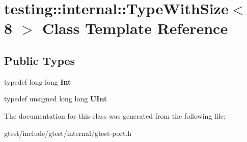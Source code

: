 \hypertarget{classtesting_1_1internal_1_1TypeWithSize_3_018_01_4}{}\section{testing\+:\+:internal\+:\+:Type\+With\+Size$<$ 8 $>$ Class Template Reference}
\label{classtesting_1_1internal_1_1TypeWithSize_3_018_01_4}
\subsection*{Public Types}
\begin{DoxyCompactItemize}
\item 
\mbox{\label{classtesting_1_1internal_1_1TypeWithSize_3_018_01_4_a36d5697e5f5254b0495f13c97d747e36}} 
typedef long long {\bfseries Int}
\item 
\mbox{\label{classtesting_1_1internal_1_1TypeWithSize_3_018_01_4_a747e21c5aee8faf07ec65cd4c3d1ca62}} 
typedef unsigned long long {\bfseries U\+Int}
\end{DoxyCompactItemize}


The documentation for this class was generated from the following file\+:\begin{DoxyCompactItemize}
\item 
gtest/include/gtest/internal/gtest-\/port.\+h\end{DoxyCompactItemize}
